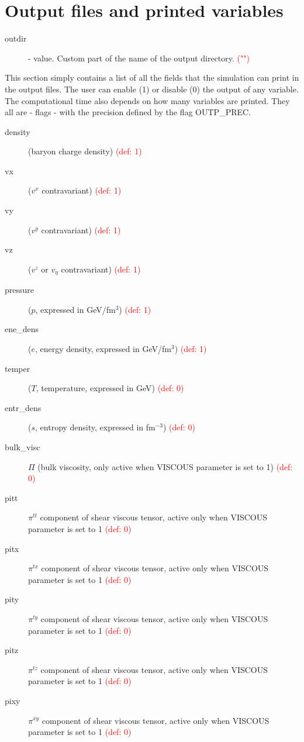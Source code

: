 \section{Output files and printed variables}
\begin{description}
	\item[outdir] \chara - value. Custom part of the name of the output directory. \textcolor{red}{("")}
\end{description}
This section simply contains a list of all the fields that the simulation can print in the output files. The user can enable (1) or disable (0)
the output of any variable. The computational time also depends on how many variables are printed. They all are \real - flags -  with the precision defined by the flag OUTP\_PREC.
\begin{description}
\item[density] (baryon charge density)  \textcolor{red}{(def: 1)}
\item[vx] ($v^x$ contravariant) \textcolor{red}{(def: 1)}
\item[vy] ($v^y$ contravariant) \textcolor{red}{(def: 1)}
\item[vz] ($v^z$ or $v_{\eta}$ contravariant) \textcolor{red}{(def: 1)}
\item[pressure] ($p$, expressed in GeV/fm$^3$) \textcolor{red}{(def: 1)}
\item[ene\_dens] ($e$, energy density, expressed in GeV/fm$^3$) \textcolor{red}{(def: 1)}
\item[temper] ($T$, temperature, expressed in GeV) \textcolor{red}{(def: 0)}
\item[entr\_dens] ($s$, entropy density, expressed in fm$^{-3}$) \textcolor{red}{(def: 0)}
\item[bulk\_visc] $\Pi$ (bulk viscosity, only active when VISCOUS parameter is set to 1) \textcolor{red}{(def: 0)}
\item[pitt] $\pi^{tt}$ component of shear viscous tensor, active only when VISCOUS parameter is set to 1 \textcolor{red}{(def: 0)}
\item[pitx] $\pi^{tx}$ component of shear viscous tensor, active only when VISCOUS parameter is set to 1 \textcolor{red}{(def: 0)}
\item[pity] $\pi^{ty}$ component of shear viscous tensor, active only when VISCOUS parameter is set to 1 \textcolor{red}{(def: 0)}
\item[pitz] $\pi^{tz}$ component of shear viscous tensor, active only when VISCOUS parameter is set to 1 \textcolor{red}{(def: 0)}
\item[pixy] $\pi^{xy}$ component of shear viscous tensor, active only when VISCOUS parameter is set to 1 \textcolor{red}{(def: 0)}

\end{description}
